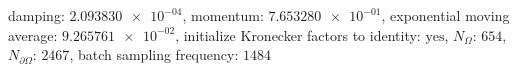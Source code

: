 damping: $\num[scientific-notation=true]{2.093830e-04}$, momentum: $\num[scientific-notation=true]{7.653280e-01}$, exponential moving average: $\num[scientific-notation=true]{9.265761e-02}$, initialize Kronecker factors to identity: $\text{yes}$, $N_{\Omega}$: $\num[scientific-notation=false]{654}$, $N_{\partial\Omega}$: $\num[scientific-notation=false]{2467}$, batch sampling frequency: $\num[scientific-notation=false]{1484}$